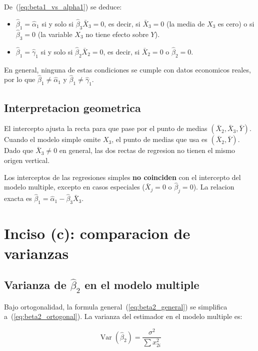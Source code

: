 \documentclass[12pt, letterpaper]{article}
\theoremstyle{remark}
\newcommand{\Var}{\operatorname{Var}}
\begin{document}
De~(\ref{eq:beta1_vs_alpha1}) se deduce:
\begin{itemize}[leftmargin=1.6em, itemsep=4pt]
  \item $\hat\beta_1 = \hat\alpha_1$ si y solo si $\hat\beta_3 \bar X_3 = 0$,
    es decir, si $\bar X_3 = 0$ (la media de $X_3$ es cero) o si
    $\hat\beta_3 = 0$ (la variable $X_3$ no tiene efecto sobre $Y$).
  \item $\hat\beta_1 = \hat\gamma_1$ si y solo si $\hat\beta_2 \bar X_2 = 0$,
    es decir, si $\bar X_2 = 0$ o $\hat\beta_2 = 0$.
\end{itemize}

En general, ninguna de estas condiciones se cumple con datos economicos reales,
por lo que $\hat\beta_1 \neq \hat\alpha_1$ y $\hat\beta_1 \neq \hat\gamma_1$.

\subsection{Interpretacion geometrica}

El intercepto ajusta la recta para que pase por el punto de medias
$(\bar X_2, \bar X_3, \bar Y)$. Cuando el modelo simple omite $X_3$, el punto
de medias que usa es $(\bar X_2, \bar Y)$. Dado que $\bar X_3 \neq 0$ en
general, las dos rectas de regresion no tienen el mismo origen vertical.

\begin{clave}
  Los interceptos de las regresiones simples \textbf{no coinciden} con el
  intercepto del modelo multiple, excepto en casos especiales ($\bar X_j = 0$
  o $\hat\beta_j = 0$). La relacion exacta es
  $\hat\beta_1 = \hat\alpha_1 - \hat\beta_3 \bar X_3$.
\end{clave}

\section{Inciso (c): comparacion de varianzas}

\subsection{Varianza de \texorpdfstring{$\hat\beta_2$}{beta2} en el modelo multiple}

Bajo ortogonalidad, la formula general~(\ref{eq:beta2_general}) se simplifica
a~(\ref{eq:beta2_ortogonal}). La varianza del estimador en el modelo multiple es:

\begin{equation}
  \Var(\hat\beta_2)
    = \frac{\sigma^2}{\sum x_{2i}^2}
  \label{eq:var_beta2}
\end{equation}
\end{document}
